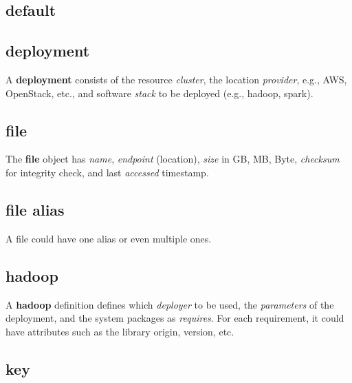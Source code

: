 \documentclass[9pt,twocolumn,twoside]{styles/osajnl}
\begin{document}
\subsection{default}


\subsection{deployment}

A \textbf{deployment} consists of the resource \- \textit{cluster},
the location \- \textit{provider}, e.g., AWS, OpenStack, etc., and
software \textit{stack} to be deployed (e.g., hadoop, spark).


\subsection{file}

The \textbf{file} object has \textit{name}, \textit{endpoint} (location), \textit{size}
in GB, MB, Byte, \textit{checksum} for integrity check, and last \textit{accessed} timestamp.


\subsection{file alias}

A file could have one alias or even multiple ones.


\subsection{hadoop}

A \textbf{hadoop} definition defines which \textit{deployer} to be used,
the \textit{parameters} of the deployment, and the system packages as
\textit{requires}. For each requirement, it could have attributes such
as the library origin, version, etc.


\subsection{key}

\end{document}
